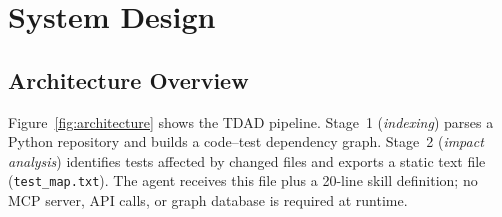 \documentclass[sigconf,nonacm]{acmart}
\begin{document}
\section{System Design}
\label{sec:design}

\subsection{Architecture Overview}

Figure~\ref{fig:architecture} shows the \textsc{TDAD} pipeline.  Stage~1
(\emph{indexing}) parses a Python repository and builds a code--test
dependency graph.  Stage~2 (\emph{impact analysis}) identifies tests affected
by changed files and exports a static text file (\texttt{test\_map.txt}).
The agent receives this file plus a 20-line skill definition; no MCP server,
API calls, or graph database is required at runtime.
\end{document}
